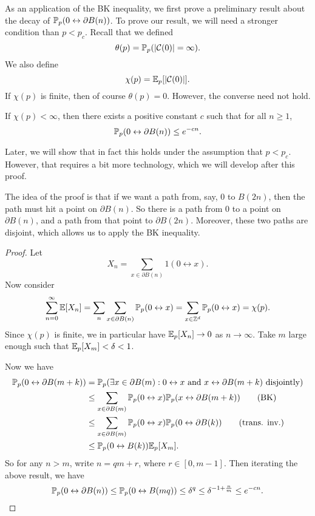 \documentclass[a4paper]{article}
\begin{document}
As an application of the BK inequality, we first prove a preliminary result about the decay of $\P_p(0 \leftrightarrow \partial B(n))$. To prove our result, we will need a stronger condition than $p < p_c$. Recall that we defined
\[
  \theta(p) = \P_p( |\mathcal{C}(0)| = \infty).
\]
We also define
\[
  \chi(p) = \E_p[|\mathcal{C}(0)|].
\]
If $\chi(p)$ is finite, then of course $\theta(p) = 0$. However, the converse need not hold.

\begin{thm}
  If $\chi(p) < \infty$, then there exists a positive constant $c$ such that for all $n \geq 1$,
  \[
    \P_p(0 \leftrightarrow \partial B(n)) \leq e^{-cn}.
  \]
\end{thm}
Later, we will show that in fact this holds under the assumption that $p < p_c$. However, that requires a bit more technology, which we will develop after this proof.

The idea of the proof is that if we want a path from, say, $0$ to $B(2n)$, then the path must hit a point on $\partial B(n)$. So there is a path from $0$ to a point on $\partial B(n)$, and a path from that point to $\partial B(2n)$. Moreover, these two paths are disjoint, which allows us to apply the BK inequality.
\begin{proof}
  Let
  \[
    X_n = \sum_{x \in \partial B(n)} 1(0 \leftrightarrow x).
  \]
  Now consider
  \[
    \sum_{n = 0}^\infty \E[X_n] = \sum_n \sum_{x \in \partial B(n)} \P_p(0 \leftrightarrow x) = \sum_{x \in \Z^d} \P_p(0 \leftrightarrow x) = \chi(p).
  \]
  Since $\chi(p)$ is finite, we in particular have $\E_p[X_n] \to 0$ as $n \to \infty$. Take $m$ large enough such that $\E_p[X_m] < \delta < 1$.

  Now we have
  \begin{align*}
    \P_p( 0 \leftrightarrow \partial B(m + k)) &= \P_p(\exists x \in \partial B(m) : 0 \leftrightarrow x \text{ and } x \leftrightarrow \partial B(m + k)\text{ disjointly})\\
    &\leq \sum_{x \in \partial B(m)} \P_p(0 \leftrightarrow x) \P_p(x \leftrightarrow \partial B(m + k)) \tag{BK}\\
    &\leq \sum_{x \in \partial B(m)} \P_p(0 \leftrightarrow x) \P_p(0 \leftrightarrow \partial B(k)) \tag{trans. inv.}\\
    &\leq \P_p(0 \leftrightarrow B(k)) \E_p[X_m].
  \end{align*}
  So for any $n > m$, write $n = qm + r$, where $r \in [0, m - 1]$. Then iterating the above result, we have
  \[
    \P_p(0 \leftrightarrow \partial B(n)) \leq \P_p(0 \leftrightarrow B(mq)) \leq \delta^q \leq \delta^{-1 + \frac{n}{m}} \leq e^{-cn}.\qedhere
  \]
\end{proof}
\end{document}
